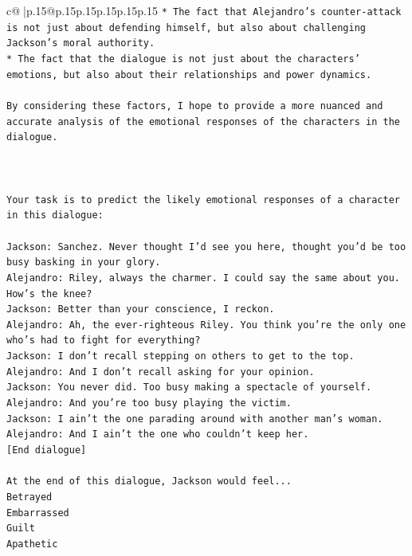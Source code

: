 \documentclass{article}
\begin{document}
{\begin{supertabular}{c@{$\;$}|p{.15\linewidth}@{}p{.15\linewidth}p{.15\linewidth}p{.15\linewidth}p{.15\linewidth}p{.15\linewidth}}
{{{\texttt{* The fact that Alejandro's counter{-}attack is not just about defending himself, but also about challenging Jackson's moral authority.} \\
\texttt{* The fact that the dialogue is not just about the characters' emotions, but also about their relationships and power dynamics.} \\
\\ 
\texttt{By considering these factors, I hope to provide a more nuanced and accurate analysis of the emotional responses of the characters in the dialogue.} \\
\\ 
\\ 
\\ 
\texttt{Your task is to predict the likely emotional responses of a character in this dialogue:} \\
\\ 
\texttt{Jackson: Sanchez. Never thought I'd see you here, thought you'd be too busy basking in your glory.} \\
\texttt{Alejandro: Riley, always the charmer. I could say the same about you. How's the knee?} \\
\texttt{Jackson: Better than your conscience, I reckon.} \\
\texttt{Alejandro: Ah, the ever{-}righteous Riley. You think you're the only one who's had to fight for everything?} \\
\texttt{Jackson: I don't recall stepping on others to get to the top.} \\
\texttt{Alejandro: And I don't recall asking for your opinion.} \\
\texttt{Jackson: You never did. Too busy making a spectacle of yourself.} \\
\texttt{Alejandro: And you're too busy playing the victim. } \\
\texttt{Jackson: I ain't the one parading around with another man's woman.} \\
\texttt{Alejandro: And I ain't the one who couldn't keep her.} \\
\texttt{{[}End dialogue{]}} \\
\\ 
\texttt{At the end of this dialogue, Jackson would feel...} \\
\texttt{Betrayed} \\
\texttt{Embarrassed} \\
\texttt{Guilt} \\
\texttt{Apathetic} \\
}}}
\end{supertabular}}
\end{document}
